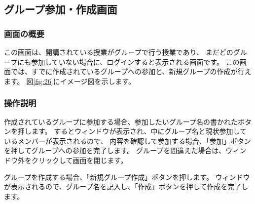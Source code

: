 
\newpage

\subsection{グループ参加・作成画面}
\subsubsection{画面の概要}
この画面は、開講されている授業がグループで行う授業であり、
まだどのグループにも参加していない場合に、ログインすると表示される画面です。
この画面では、すでに作成されているグループへの参加と、新規グループの作成が行えます。
図\ref{fig:26}にイメージ図を示します。

\subsubsection{操作説明}

作成されているグループに参加する場合、参加したいグループ名の書かれたボタンを押します。
するとウィンドウが表示され、中にグループ名と現状参加しているメンバーが表示されるので、
内容を確認して参加する場合、「参加」ボタンを押してグループへの参加を完了します。
グループを間違えた場合は、ウィンドウ外をクリックして画面を閉じます。

グループを作成する場合、「新規グループ作成」ボタンを押します。
ウィンドウが表示されるので、グループ名を記入し、「作成」ボタンを押して作成を完了します。

